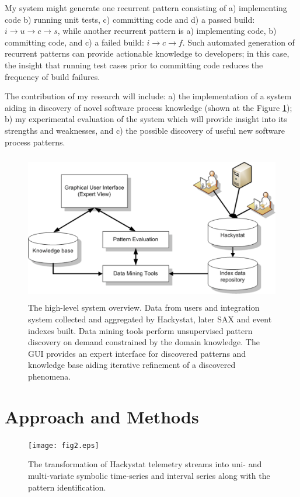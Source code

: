 \documentclass[11pt,oneside]{article}
\begin{document}
My system might generate one recurrent pattern consisting of a) implementing code b) running unit tests, c) committing code and d) a passed build: $i \rightarrow u \rightarrow c \rightarrow s $, while another recurrent pattern is a) implementing code, b) committing code, and c) a failed build: $i \rightarrow c \rightarrow f $. Such automated generation of recurrent patterns can provide actionable knowledge to developers; in this case, the insight that running test cases prior to committing code reduces the frequency of build failures.

The contribution of my research will include: a) the implementation of a system aiding in discovery of novel software process knowledge (shown at the Figure \ref{fig:system_overview}); b) my experimental evaluation of the system which will provide insight into its strengths and weaknesses, and c) the possible discovery of useful new software process patterns.
\begin{figure}[tbp]
   \centering
   \includegraphics[height=65mm]{system_overview.eps}
   \caption{The high-level system overview. Data from users and integration system collected and aggregated by Hackystat, later SAX and event indexes built. Data mining tools perform unsupervised pattern discovery on demand constrained by the domain knowledge. The GUI provides an expert interface for discovered patterns and knowledge base aiding iterative refinement of a discovered phenomena.}
   \label{fig:system_overview}
\end{figure}

\section{Approach and Methods}
\begin{figure}[tbp]
   \centering
   \texttt{[image: fig2.eps]}
   \caption{The transformation of Hackystat telemetry streams into uni- and multi-variate symbolic time-series and interval series along with the pattern identification.}
   \label{fig:fig2}
\end{figure}
\end{document}
